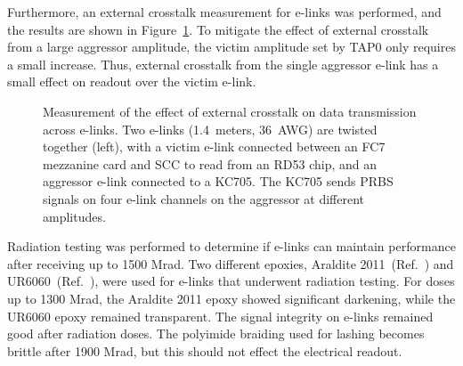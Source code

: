 \documentclass[a4paper,11pt]{article}
\newcommand{\mrad}{Mrad}
\newcommand{\fig}{Figure}
\begin{document}

Furthermore, an external crosstalk measurement for e-links was performed, and the results are shown in \fig~\ref{fig:external_crosstalk}.
To mitigate the effect of external crosstalk from a large aggressor amplitude, the victim amplitude set by TAP0 only requires a small increase.
Thus, external crosstalk from the single aggressor e-link has a small effect on readout over the victim e-link.

\begin{figure}[htbp]
\centering
{}
\hspace*{.2in}
\caption{
\label{fig:external_crosstalk}
Measurement of the effect of external crosstalk on data transmission across e-links.
Two e-links (1.4~meters, 36~AWG) are twisted together (left), with a victim e-link connected between an FC7 mezzanine card and SCC to read from an RD53 chip, and an aggressor e-link connected to a KC705.
The KC705 sends PRBS signals on four e-link channels on the aggressor at different amplitudes.
}
\end{figure}

Radiation testing was performed to determine if e-links can maintain performance after receiving up to 1500 \mrad.
Two different epoxies, Araldite 2011~(Ref.~\cite{ref:araldite}) and UR6060~(Ref.~\cite{ref:ur}), were used for e-links that underwent radiation testing.
For doses up to 1300 \mrad, the Araldite 2011 epoxy showed significant darkening, while the UR6060 epoxy remained transparent.
The signal integrity on e-links remained good after radiation doses.
The polyimide braiding used for lashing becomes brittle after 1900 \mrad, but this should not effect the electrical readout.
\end{document}
